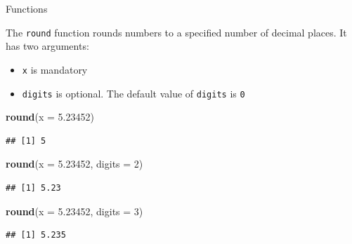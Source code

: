 \documentclass[ignorenonframetext,]{beamer}
\newenvironment{Shaded}{\begin{snugshade}}{\end{snugshade}}
\newcommand{\DataTypeTok}[1]{\textcolor[rgb]{0.13,0.29,0.53}{#1}}
\newcommand{\DecValTok}[1]{\textcolor[rgb]{0.00,0.00,0.81}{#1}}
\newcommand{\FloatTok}[1]{\textcolor[rgb]{0.00,0.00,0.81}{#1}}
\newcommand{\KeywordTok}[1]{\textcolor[rgb]{0.13,0.29,0.53}{\textbf{#1}}}
\newcommand{\NormalTok}[1]{#1}
\begin{document}
\begin{frame}[fragile]{Functions}
\protect\hypertarget{functions-3}{}

The \texttt{round} function rounds numbers to a specified number of
decimal places. It has two arguments:

\begin{itemize}
\item
  \texttt{x} is mandatory
\item
  \texttt{digits} is optional. The default value of \texttt{digits} is
  \texttt{0}
\end{itemize}

\begin{Shaded}
\begin{Highlighting}[]
\KeywordTok{round}\NormalTok{(}\DataTypeTok{x =} \FloatTok{5.23452}\NormalTok{)}
\end{Highlighting}
\end{Shaded}

\begin{verbatim}
## [1] 5
\end{verbatim}

\begin{Shaded}
\begin{Highlighting}[]
\KeywordTok{round}\NormalTok{(}\DataTypeTok{x =} \FloatTok{5.23452}\NormalTok{, }\DataTypeTok{digits =} \DecValTok{2}\NormalTok{)}
\end{Highlighting}
\end{Shaded}

\begin{verbatim}
## [1] 5.23
\end{verbatim}

\begin{Shaded}
\begin{Highlighting}[]
\KeywordTok{round}\NormalTok{(}\DataTypeTok{x =} \FloatTok{5.23452}\NormalTok{, }\DataTypeTok{digits =} \DecValTok{3}\NormalTok{)}
\end{Highlighting}
\end{Shaded}

\begin{verbatim}
## [1] 5.235
\end{verbatim}

\end{frame}
\end{document}

